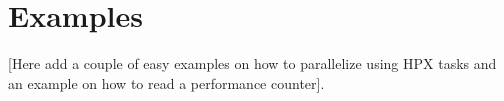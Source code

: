 
~\\~
\section{Examples} \label{sec:examples}


[\TODO Here add a couple of easy examples on how to parallelize using HPX tasks and an example on how to read a performance counter].


